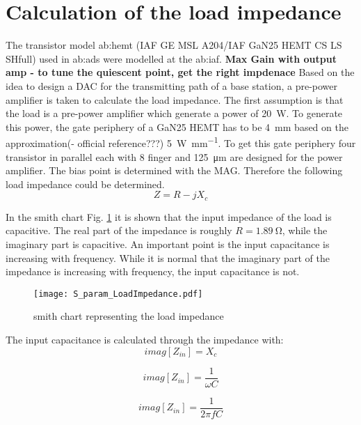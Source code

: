 \section{Calculation of the load impedance}
The transistor model \gls{ab:hemt} (IAF GE MSL A204/IAF GaN25 HEMT CS LS SHfull) used in \gls{ab:ads} were modelled at the \gls{ab:iaf}.
\textbf{Max Gain with output amp - to tune the quiescent point, get the right impdenace}
Based on the idea to design  a DAC for the transmitting path of a base station, a pre-power amplifier is taken to calculate the load impedance. The first assumption is that the load is a pre-power amplifier which generate a power of \SI{20}{\watt}. To generate this power, the gate periphery of a GaN25 HEMT has to be \SI{4}{\milli \metre} based on the approximation(- official reference???) \SI[per-mode=fraction]{5}{\watt\per\milli\metre}. To get this gate periphery four transistor in parallel each with 8 finger and \SI{125}{\micro \metre} are designed for the power amplifier. The bias point is determined with the MAG. Therefore the following load impedance could be determined.
\begin{equation}
Z = R - jX_c
\end{equation}

In the smith chart Fig. \ref{fig:smith_load_impedance} it is shown that the input impedance of the load is capacitive. The real part of the impedance is roughly $R = \SI{1.89}{\ohm}$, while the imaginary part is capacitive. An important point is the input capacitance is increasing with frequency. While it is normal that the imaginary part of the impedance is increasing with frequency, the input capacitance is not.

 \begin{figure}[ht]
	\centering
  \texttt{[image: S\_param\_LoadImpedance.pdf]}
	\caption{smith chart representing the load impedance}
	\label{fig:smith_load_impedance}
\end{figure}

The input capacitance is calculated through the impedance with:
\begin{equation}
imag[Z_{in}] = X_c
\end{equation}

\begin{equation}
imag[Z_{in}] = \frac{1}{\omega C}
\end{equation}

\begin{equation}
imag[Z_{in}] = \frac{1}{2 \pi f C}
\end{equation}

